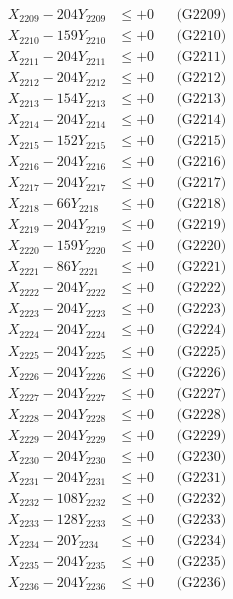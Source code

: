 \documentclass[a4paper,10pt]{article}
\begin{document}
{\begin{align}
X_{2209} - 204Y_{2209} &\leq +0 && \text{(G2209)} \\
X_{2210} - 159Y_{2210} &\leq +0 && \text{(G2210)} \\
\allowbreak
X_{2211} - 204Y_{2211} &\leq +0 && \text{(G2211)} \\
X_{2212} - 204Y_{2212} &\leq +0 && \text{(G2212)} \\
X_{2213} - 154Y_{2213} &\leq +0 && \text{(G2213)} \\
X_{2214} - 204Y_{2214} &\leq +0 && \text{(G2214)} \\
X_{2215} - 152Y_{2215} &\leq +0 && \text{(G2215)} \\
X_{2216} - 204Y_{2216} &\leq +0 && \text{(G2216)} \\
X_{2217} - 204Y_{2217} &\leq +0 && \text{(G2217)} \\
X_{2218} - 66Y_{2218} &\leq +0 && \text{(G2218)} \\
X_{2219} - 204Y_{2219} &\leq +0 && \text{(G2219)} \\
X_{2220} - 159Y_{2220} &\leq +0 && \text{(G2220)} \\
\allowbreak
X_{2221} - 86Y_{2221} &\leq +0 && \text{(G2221)} \\
X_{2222} - 204Y_{2222} &\leq +0 && \text{(G2222)} \\
X_{2223} - 204Y_{2223} &\leq +0 && \text{(G2223)} \\
X_{2224} - 204Y_{2224} &\leq +0 && \text{(G2224)} \\
X_{2225} - 204Y_{2225} &\leq +0 && \text{(G2225)} \\
X_{2226} - 204Y_{2226} &\leq +0 && \text{(G2226)} \\
X_{2227} - 204Y_{2227} &\leq +0 && \text{(G2227)} \\
X_{2228} - 204Y_{2228} &\leq +0 && \text{(G2228)} \\
X_{2229} - 204Y_{2229} &\leq +0 && \text{(G2229)} \\
X_{2230} - 204Y_{2230} &\leq +0 && \text{(G2230)} \\
\allowbreak
X_{2231} - 204Y_{2231} &\leq +0 && \text{(G2231)} \\
X_{2232} - 108Y_{2232} &\leq +0 && \text{(G2232)} \\
X_{2233} - 128Y_{2233} &\leq +0 && \text{(G2233)} \\
X_{2234} - 20Y_{2234} &\leq +0 && \text{(G2234)} \\
X_{2235} - 204Y_{2235} &\leq +0 && \text{(G2235)} \\
X_{2236} - 204Y_{2236} &\leq +0 && \text{(G2236)} \\

\end{align}}
\end{document}
